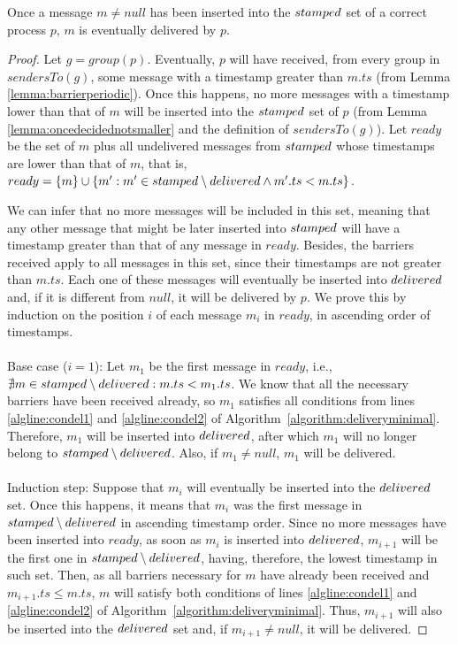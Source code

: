 \documentclass[times, 10pt]{article}
\begin{document}
\begin{lems} \label{lemma:oncebpwilldel}
Once a message $m \neq null$ has been inserted into the $stamped$ set of a correct process $p$, $m$ is eventually delivered by $p$.
\end{lems}

\begin{proof}
Let $g = group(p)$. Eventually, $p$ will have received, from every group in $sendersTo(g)$, some message with a timestamp greater than $m.ts$ (from Lemma \ref{lemma:barrierperiodic}). Once this happens, no more messages with a timestamp lower than that of $m$ will be inserted into the $stamped$ set of $p$ (from Lemma \ref{lemma:oncedecidednotsmaller} and the definition of $sendersTo(g)$). Let $ready$ be the set of $m$ plus all undelivered messages from $stamped$ whose timestamps are lower than that of $m$, that is, $ready = \{m\} \cup \{m' : m' \in stamped \setminus delivered \wedge m'.ts < m.ts\}$.

We can infer that no more messages will be included in this set, meaning that any other message that might be later inserted into $stamped$ will have a timestamp greater than that of any message in $ready$. Besides, the barriers received apply to all messages in this set, since their timestamps are not greater than $m.ts$. Each one of these messages will eventually be inserted into $delivered$ and, if it is different from $null$, it will be delivered by $p$. We prove this by induction on the position $i$ of each message $m_i$ in $ready$, in ascending order of timestamps.\\
\\
\noindent Base case ($i=1$): Let $m_1$ be the first message in $ready$, i.e., \mbox{$\nexists m \in stamped \setminus delivered : m.ts < m_1.ts$}. We know that all the necessary barriers have been received already, so $m_1$ satisfies all conditions from lines \ref{algline:condel1} and \ref{algline:condel2} of \mbox{Algorithm \ref{algorithm:deliveryminimal}}. Therefore, $m_1$ will be inserted into $delivered$, after which $m_1$ will no longer belong to $stamped \setminus delivered$. Also, if $m_1 \neq null$, $m_1$ will be delivered.\\
\\
\noindent Induction step: Suppose that $m_{i}$ will eventually be inserted into the $delivered$ set. Once this happens, it means that $m_{i}$ was the first message in $stamped \setminus delivered$ in ascending timestamp order. Since no more messages have been inserted into $ready$, as soon as $m_{i}$ is inserted into $delivered$, $m_{i+1}$ will be the first one in $stamped \setminus delivered$, having, therefore, the lowest timestamp in such set. Then, as all barriers necessary for $m$ have already been received and $m_{i+1}.ts \leq m.ts$, $m$ will satisfy both conditions of lines \ref{algline:condel1} and \ref{algline:condel2} of \mbox{Algorithm \ref{algorithm:deliveryminimal}}. Thus, $m_{i+1}$ will also be inserted into the $delivered$ set and, if $m_{i+1} \neq null$, it will be delivered.
\end{proof}
\end{document}
